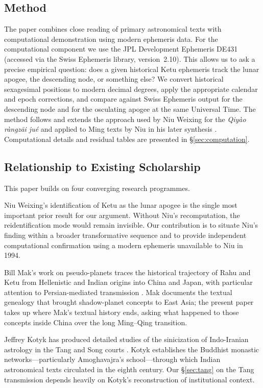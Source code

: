 \documentclass[10pt,a4paper]{article}
\begin{document}
\subsection*{Method}

The paper combines close reading of primary astronomical texts with computational
demonstration using modern ephemeris data.  For the computational component
we use the JPL Development Ephemeris DE431 (accessed via the Swiss Ephemeris
library, version~2.10).  This allows us to ask a precise empirical
question: does a given historical Ketu ephemeris track the lunar apogee, the
descending node, or something else?  We convert historical sexagesimal positions
to modern decimal degrees, apply the appropriate calendar and epoch corrections,
and compare against Swiss Ephemeris output for the descending node and for the
osculating apogee at the same Universal Time.  The method follows and extends
the approach used by Niu Weixing \cite{niu1995ketu} for the \textit{Qiy\`ao r\`angz\=ai ju\'e} and
applied to Ming texts by Niu in his later synthesis \cite{niu2010fourremains}.
Computational details and residual tables are presented in \S\ref{sec:computation}.

\subsection*{Relationship to Existing Scholarship}

This paper builds on four converging research programmes.

Niu Weixing's identification of Ketu as the lunar apogee
\cite{niu1995ketu,niu2010fourremains} is the single most important prior result
for our argument.  Without Niu's recomputation, the reidentification mode would
remain invisible.  Our contribution is to situate Niu's finding within a broader
transformative sequence and to provide independent computational confirmation
using a modern ephemeris unavailable to Niu in 1994.

Bill Mak's work on pseudo-planets traces the historical trajectory of Rahu and
Ketu from Hellenistic and Indian origins into China and Japan, with particular
attention to Persian-mediated transmission \cite{mak2014pseudoplanets,mak2024persian}.
Mak documents the textual genealogy that brought shadow-planet concepts to East
Asia; the present paper takes up where Mak's textual history ends, asking what
happened to those concepts inside China over the long Ming--Qing transition.

Jeffrey Kotyk has produced detailed studies of the sinicization of Indo-Iranian
astrology in the Tang and Song courts \cite{kotyk2018sinicization,kotyk2017buddhist}.
Kotyk establishes the Buddhist monastic networks---particularly Amoghavajra's
school---through which Indian astronomical texts circulated in the eighth century.
Our \S\ref{sec:tang} on the Tang transmission depends heavily on Kotyk's
reconstruction of institutional context.
\end{document}
